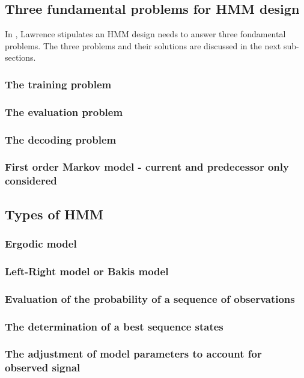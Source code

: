 \subsection{Three fundamental problems for HMM design}
In %
, Lawrence stipulates an HMM design needs to answer three fondamental problems. The three problems and their solutions are discussed in the next sub-sections. 

\subsubsection{The training problem}
\subsubsection{The evaluation problem}
\subsubsection{The decoding problem}

\subsubsection{First order Markov model - current and predecessor only considered}

\subsection{Types of HMM}
\subsubsection{Ergodic model}
\subsubsection{Left-Right model or Bakis model}
\subsubsection{Evaluation of the probability of a sequence of observations}
\subsubsection{The determination of a best sequence states}
\subsubsection{The adjustment of model parameters to account for observed signal}
